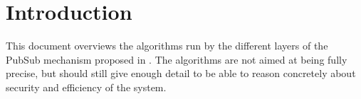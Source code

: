 \section{Introduction}
\label{sec:introduction}

This document overviews the algorithms run by the different layers of the PubSub mechanism proposed in \cite{akv24}. The algorithms are not aimed at being fully precise, but should still give enough detail to be able to reason concretely about security and efficiency of the system.